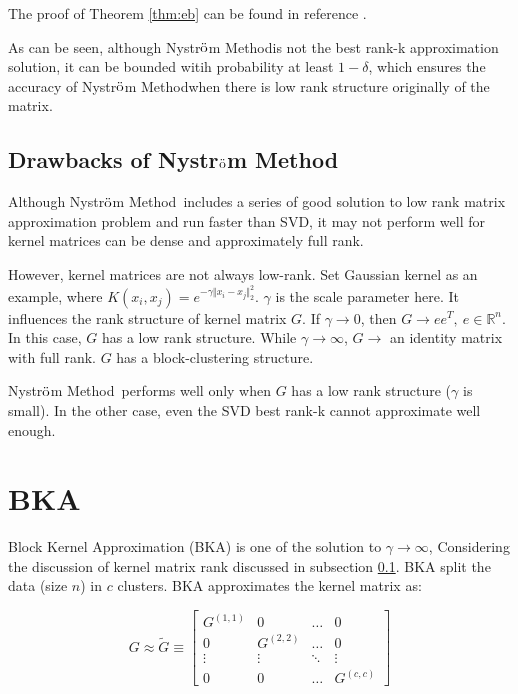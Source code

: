 \documentclass[12pt, a4paper, oneside]{article}
\newcommand{\nysm}{Nystr$\ddot{\rm o}$m Method}
\begin{document}
The proof of Theorem \ref{thm:eb} can be found in reference \cite{nmsemble}.

As can be seen, although \nysm is not the best rank-k approximation solution, it can be bounded witih probability at least $1-\delta$, which ensures the accuracy of \nysm when there is low rank structure originally of the matrix.
\subsection{Drawbacks of \nysm}
\label{subsec:dnm}

Although \nysm\ includes a series of good solution to low rank matrix approximation problem and run faster than SVD, it may not perform well for kernel matrices can be dense and approximately full rank. 

However, kernel matrices are not always low-rank. Set Gaussian kernel as an example, where $K(x_i, x_j) = e^{-\gamma\Vert x_i - x_j\Vert^2_2}$. $\gamma$ is the scale parameter here. It influences the rank structure of kernel matrix $G$. If $\gamma \to 0$, then $G\to ee^T,\ e\in \mathbb{R}^n$. In this case, $G$ has a low rank structure. While $\gamma \to \infty$, $G \to$ an identity matrix with full rank. $G$ has a block-clustering structure.

\nysm\ performs well only when $G$ has a low rank structure ($\gamma$ is small). In the other case, even the SVD best rank-k cannot approximate well enough.

\section{BKA}
\label{sec:bka}

Block Kernel Approximation (BKA) is one of the solution to $\gamma \to \infty$, Considering the discussion of kernel matrix rank discussed in subsection \ref{subsec:dnm}. BKA split the data (size $n$) in $c$ clusters. BKA approximates
the kernel matrix as:

\begin{equation}
	G \approx \tilde{G} \equiv\left[\begin{array}{cccc}
		G^{(1,1)} & 0 & \ldots & 0 \\
		0 & G^{(2,2)} & \ldots & 0 \\
		\vdots & \vdots & \ddots & \vdots \\
		0 & 0 & \ldots & G^{(c, c)}
	\end{array}\right]
\end{equation}
\end{document}
